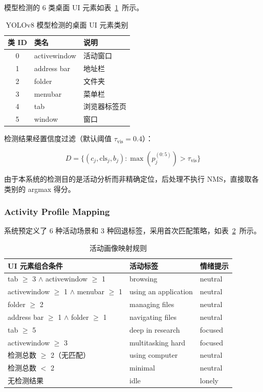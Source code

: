 模型检测的 6 类桌面 UI 元素如表~\ref{tab:ui-classes}~所示。

\begin{table}[htbp]
\centering
\caption{YOLOv8 模型检测的桌面 UI 元素类别}
\label{tab:ui-classes}
\begin{tabular}{@{}cll@{}}
\toprule
\textbf{类 ID} & \textbf{类名} & \textbf{说明} \\
\midrule
0 & activewindow & 活动窗口 \\
1 & address bar & 地址栏 \\
2 & folder & 文件夹 \\
3 & menubar & 菜单栏 \\
4 & tab & 浏览器标签页 \\
5 & window & 窗口 \\
\bottomrule
\end{tabular}
\end{table}

检测结果经置信度过滤（默认阈值 $\tau_{\text{vis}} = 0.4$）：

\begin{equation}
D = \{(c_j, \text{cls}_j, b_j) : \max(p_j^{(0:5)}) > \tau_{\text{vis}}\}
\end{equation}

由于本系统的检测目的是活动分析而非精确定位，后处理不执行 NMS，直接取各类别的 argmax 得分。

\subsubsection{Activity Profile Mapping}

系统预定义了 6 种活动场景和 3 种回退标签，采用首次匹配策略，如表~\ref{tab:activity-profiles}~所示。

\begin{table}[htbp]
\centering
\caption{活动画像映射规则}
\label{tab:activity-profiles}
\begin{tabular}{@{}lll@{}}
\toprule
\textbf{UI 元素组合条件} & \textbf{活动标签} & \textbf{情绪提示} \\
\midrule
tab $\geq$ 3 $\land$ activewindow $\geq$ 1 & browsing & neutral \\
activewindow $\geq$ 1 $\land$ menubar $\geq$ 1 & using an application & neutral \\
folder $\geq$ 2 & managing files & neutral \\
address bar $\geq$ 1 $\land$ folder $\geq$ 1 & navigating files & neutral \\
tab $\geq$ 5 & deep in research & focused \\
activewindow $\geq$ 3 & multitasking hard & focused \\
检测总数 $\geq$ 2（无匹配） & using computer & neutral \\
检测总数 $<$ 2 & minimal & neutral \\
无检测结果 & idle & lonely \\
\bottomrule
\end{tabular}
\end{table}

